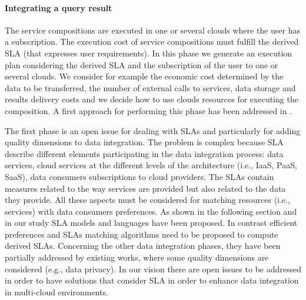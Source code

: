 \paragraph{Integrating a query result} 
The service compositions are executed in one or several clouds where the user has a subscription. The execution cost of  service compositions must fulfill the derived SLA (that expresses user requirements). In this phase we generate an execution plan  considering the derived SLA and the subscription of the user to one or several clouds. We consider for example the economic cost determined by the data to be transferred, the number of external calls to services, data storage and results delivery costs and we decide how to use clouds resources for executing the composition. A first approach for performing this phase has been addressed  in  \cite{Lopez14}.

The first phase is an open issue for dealing with SLAs and particularly for adding quality dimensions to  data integration. The problem is complex because SLA describe different elements participating in the data integration process: data services, cloud services at the different levels of the architecture (i.e., IaaS, PaaS, SaaS), data consumers subscriptions to cloud providers. The SLAs contain measures related to the way services are provided but also related to the data they provide. All these aspects must be considered for matching resources (i.e., services) with data consumers preferences. As shown in the following section and in our study SLA models and languages have been proposed. In contrast  efficient preferences and SLAs matching algorithms need to be proposed to compute derived SLAs. Concerning the other data integration phases, they have been partially addressed by existing works, where some quality dimensions are considered (e.g., data privacy). In our vision there are open issues to be addressed in order to have solutions that consider SLA in order to enhance data integration in multi-cloud environments. 



